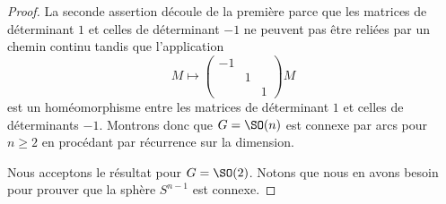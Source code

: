 \begin{proof}
    La seconde assertion découle de la première parce que les matrices de déterminant \( 1\) et celles de déterminant \( -1\) ne peuvent pas être reliées par un chemin continu tandis que l'application
    \begin{equation}
        M\mapsto \begin{pmatrix}
            -1    &       &       \\
                &   1    &       \\
                &       &   1
        \end{pmatrix}M
    \end{equation}
    est un homéomorphisme entre les matrices de déterminant \( 1\) et celles de déterminants \( -1\). Montrons donc que \( G=\SO(n)\) est connexe par arcs pour \( n\geq 2\) en procédant par récurrence sur la dimension.
    
    Nous acceptons le résultat pour $G=\SO(2)$. Notons que nous en avons besoin pour prouver que la sphère \( S^{n-1}\) est connexe.
    

\end{proof}
